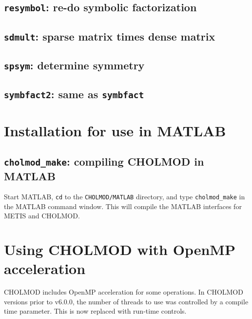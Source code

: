 \documentclass[11pt]{article}
\begin{document}
\subsection{{\tt resymbol}: re-do symbolic factorization}


\subsection{{\tt sdmult}: sparse matrix times dense matrix}


\subsection{{\tt spsym}: determine symmetry}


\subsection{{\tt symbfact2}: same as {\tt symbfact}}


\newpage \section{Installation for use in MATLAB}

\subsection{{\tt cholmod\_make}: compiling CHOLMOD in MATLAB}

Start MATLAB, {\tt cd} to the {\tt CHOLMOD/MATLAB} directory, and
type {\tt cholmod\_make} in the MATLAB command window.  This will compile
the MATLAB interfaces for METIS and CHOLMOD.

\section{Using CHOLMOD with OpenMP acceleration}

CHOLMOD includes OpenMP acceleration for some operations.  In CHOLMOD versions
prior to v6.0.0, the number of threads to use was controlled by a compile time
parameter.  This is now replaced with run-time controls.
\end{document}
